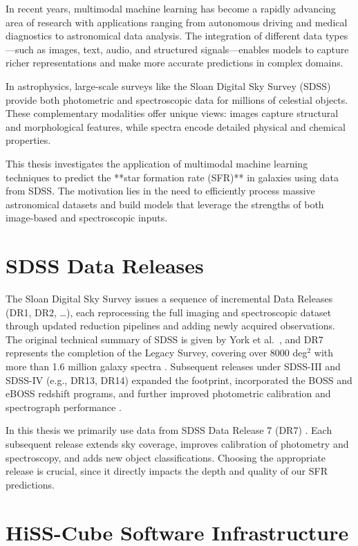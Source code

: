 \documentclass[english,bachelor,oneside]{ctufit-thesis}
\begin{document}
In recent years, multimodal machine learning has become a rapidly advancing area of research with applications ranging from autonomous driving and medical diagnostics to astronomical data analysis. The integration of different data types—such as images, text, audio, and structured signals—enables models to capture richer representations and make more accurate predictions in complex domains.

In astrophysics, large-scale surveys like the Sloan Digital Sky Survey (SDSS) \cite{york2000sloan} provide both photometric and spectroscopic data for millions of celestial objects. These complementary modalities offer unique views: images capture structural and morphological features, while spectra encode detailed physical and chemical properties.

This thesis investigates the application of multimodal machine learning techniques to predict the **star formation rate (SFR)** \cite{lopes2021effects} in galaxies using data from SDSS. The motivation lies in the need to efficiently process massive astronomical datasets and build models that leverage the strengths of both image-based and spectroscopic inputs.

\section{SDSS Data Releases} 
The Sloan Digital Sky Survey issues a sequence of incremental Data Releases (DR1, DR2, \dots), each reprocessing the full imaging and spectroscopic dataset through updated reduction pipelines and adding newly acquired observations. The original technical summary of SDSS is given by York et al.\ \cite{york2000sloan}, and DR7 represents the completion of the Legacy Survey, covering over 8000 deg$^2$ with more than 1.6 million galaxy spectra \cite{Abazajian2009}. Subsequent releases under SDSS-III and SDSS-IV (e.g., DR13, DR14) expanded the footprint, incorporated the BOSS and eBOSS redshift programs, and further improved photometric calibration and spectrograph performance \cite{Albareti2017}.


In this thesis we primarily use data from SDSS Data Release 7 (DR7) \cite{SDSSData19:online}.  
Each subsequent release extends sky coverage, improves calibration of photometry and spectroscopy,  
and adds new object classifications. Choosing the appropriate release is crucial,  
since it directly impacts the depth and quality of our SFR predictions.

\section{HiSS-Cube Software Infrastructure}
\label{sec:hisscube}
\end{document}
